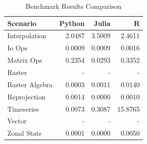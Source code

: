 \begin{table}[h]
\centering
\caption{Benchmark Results Comparison}
\begin{tabular}{lrrr}
\hline
Scenario & Python & Julia & R \\
\hline
Interpolation & 2.0487 & 3.5009 & 2.4611 \\
Io Ops & 0.0009 & 0.0009 & 0.0016 \\
Matrix Ops & 0.2354 & 0.0293 & 0.3352 \\
Raster & - & - & - \\
Raster Algebra & 0.0003 & 0.0011 & 0.0140 \\
Reprojection & 0.0014 & 0.0000 & 0.0010 \\
Timeseries & 0.0073 & 0.3087 & 15.8765 \\
Vector & - & - & - \\
Zonal Stats & 0.0001 & 0.0000 & 0.0050 \\
\hline
\end{tabular}
\end{table}